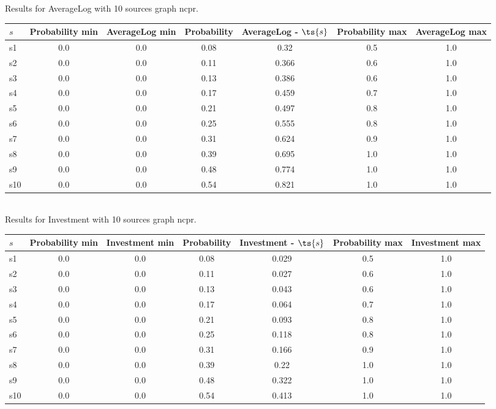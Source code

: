 \documentclass{article}
\begin{document}
\noindent Results for AverageLog with 10 sources graph ncpr.

\noindent\begin{tabular}{|l|c|c|c|c|c|c|}
\hline
$s$& Probability min & AverageLog min & Probability & AverageLog - $\ts{s}$ & Probability max & AverageLog max\\
\hline
s1 &0.0 & 0.0 & 0.08 & 0.32 & 0.5 & 1.0\\
\hline
s2 &0.0 & 0.0 & 0.11 & 0.366 & 0.6 & 1.0\\
\hline
s3 &0.0 & 0.0 & 0.13 & 0.386 & 0.6 & 1.0\\
\hline
s4 &0.0 & 0.0 & 0.17 & 0.459 & 0.7 & 1.0\\
\hline
s5 &0.0 & 0.0 & 0.21 & 0.497 & 0.8 & 1.0\\
\hline
s6 &0.0 & 0.0 & 0.25 & 0.555 & 0.8 & 1.0\\
\hline
s7 &0.0 & 0.0 & 0.31 & 0.624 & 0.9 & 1.0\\
\hline
s8 &0.0 & 0.0 & 0.39 & 0.695 & 1.0 & 1.0\\
\hline
s9 &0.0 & 0.0 & 0.48 & 0.774 & 1.0 & 1.0\\
\hline
s10 &0.0 & 0.0 & 0.54 & 0.821 & 1.0 & 1.0\\
\hline
\end{tabular}\\

\noindent Results for Investment with 10 sources graph ncpr.

\noindent\begin{tabular}{|l|c|c|c|c|c|c|}
\hline
$s$& Probability min & Investment min & Probability & Investment - $\ts{s}$ & Probability max & Investment max\\
\hline
s1 &0.0 & 0.0 & 0.08 & 0.029 & 0.5 & 1.0\\
\hline
s2 &0.0 & 0.0 & 0.11 & 0.027 & 0.6 & 1.0\\
\hline
s3 &0.0 & 0.0 & 0.13 & 0.043 & 0.6 & 1.0\\
\hline
s4 &0.0 & 0.0 & 0.17 & 0.064 & 0.7 & 1.0\\
\hline
s5 &0.0 & 0.0 & 0.21 & 0.093 & 0.8 & 1.0\\
\hline
s6 &0.0 & 0.0 & 0.25 & 0.118 & 0.8 & 1.0\\
\hline
s7 &0.0 & 0.0 & 0.31 & 0.166 & 0.9 & 1.0\\
\hline
s8 &0.0 & 0.0 & 0.39 & 0.22 & 1.0 & 1.0\\
\hline
s9 &0.0 & 0.0 & 0.48 & 0.322 & 1.0 & 1.0\\
\hline
s10 &0.0 & 0.0 & 0.54 & 0.413 & 1.0 & 1.0\\
\hline
\end{tabular}\\
\end{document}

